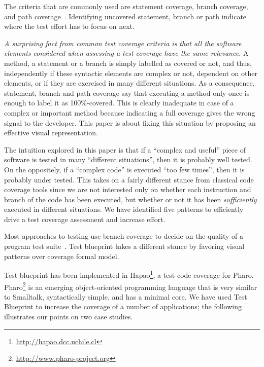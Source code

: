 \documentclass{sig-alternate}
\newcommand{\hapao}{Hapao\xspace}
\begin{document}
The criteria that are commonly used are statement coverage, branch coverage, and path coverage~\cite{Hong97a}. 
Identifying uncovered statement, branch or path indicate where the test effort has to focus on next.

\textit{A surprising fact from common test coverage criteria is that all the software elements considered when assessing a test coverage have the same relevance.} A method, a statement or a branch is simply labelled as covered or not, and thus, independently if these syntactic elements are complex or not, dependent on other elements, or if they are exercised in many different situations.
As a consequence, statement, branch and path coverage say that executing a method only once is enough to label it as 100\%-covered. This is clearly inadequate in case of a complex or important method because indicating a full coverage gives the wrong signal to the developer.
This paper is about fixing this situation by proposing an effective visual representation.

The intuition explored in this paper is that if a ``complex and useful'' piece of software is tested in many ``different situations'', then it is probably well tested. On the oppositely, if a ``complex code'' is executed ``too few times'', then it is probably under tested. This takes on a fairly different stance from classical code coverage tools since we are not interested only on whether each instruction and branch of the code has been executed, but whether or not it has been \emph{sufficiently} executed in different situations. We have identified five patterns to efficiently drive a test coverage assessment and increase effort.

Most approaches to testing use branch coverage to decide on the quality of a program test suite~\cite{Hong97a}.
Test blueprint takes a different stance by favoring visual patterns over coverage formal model. 

Test blueprint has been implemented in \hapao\footnote{\url{http://hapao.dcc.uchile.cl}}, a test code coverage for Pharo. Pharo\footnote{\url{http://www.pharo-project.org}} is an emerging object-oriented programming language that is very similar to Smalltalk, syntactically simple, and has a minimal core. We have used Test Blueprint to increase the coverage of a number of applications; the following illustrates our points on two case studies.
\end{document}
